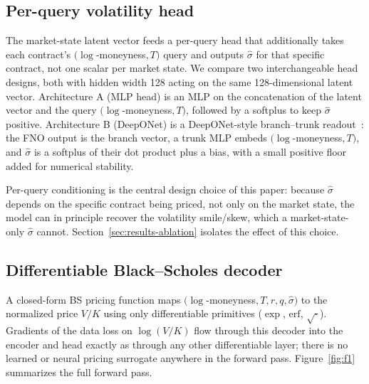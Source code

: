 \documentclass[11pt]{article}
\begin{document}
\subsection{Per-query volatility head}
\label{sec:method-head}
The market-state latent vector feeds a per-query head that additionally takes each contract's
$(\log$-moneyness$, T)$ query and outputs $\hat\sigma$ for that specific contract, not one scalar per
market state. We compare two interchangeable head designs, both with hidden width 128 acting on the
same 128-dimensional latent vector. Architecture A (MLP head) is an MLP on the concatenation of the
latent vector and the query $(\log$-moneyness$, T)$, followed by a softplus to keep $\hat\sigma$
positive. Architecture B (DeepONet) is a DeepONet-style branch--trunk readout~\citep{Lu2021DeepONet}:
the FNO output is the branch vector, a trunk MLP embeds $(\log$-moneyness$, T)$, and $\hat\sigma$ is a
softplus of their dot product plus a bias, with a small positive floor added for numerical stability.

Per-query conditioning is the central design choice of this paper: because $\hat\sigma$ depends on the
specific contract being priced, not only on the market state, the model can in principle recover the
volatility smile/skew, which a market-state-only $\hat\sigma$ cannot. Section~\ref{sec:results-ablation}
isolates the effect of this choice.

\subsection{Differentiable Black--Scholes decoder}
\label{sec:method-decoder}
A closed-form BS pricing function maps $(\log$-moneyness$, T, r, q, \hat\sigma)$ to the normalized
price $V/K$ using only differentiable primitives ($\exp$, $\mathrm{erf}$, $\sqrt{\cdot}$). Gradients of
the data loss on $\log(V/K)$ flow through this decoder into the encoder and head exactly as through any
other differentiable layer; there is no learned or neural pricing surrogate anywhere in the forward
pass. Figure~\ref{fig:f1} summarizes the full forward pass.
\end{document}
